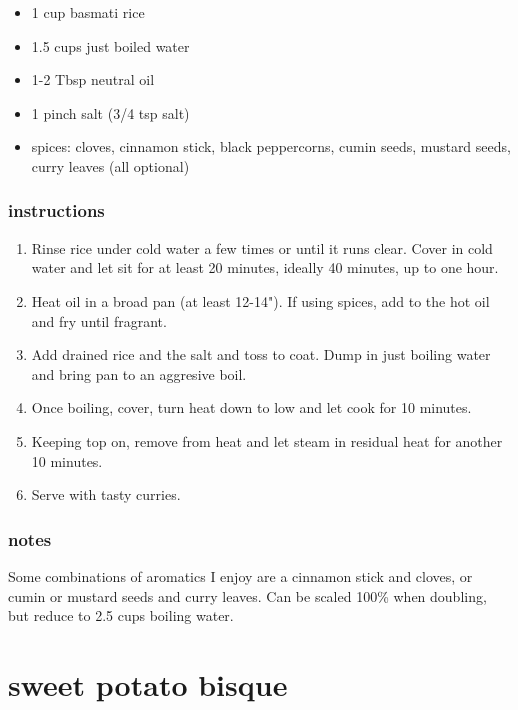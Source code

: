 \documentclass[]{book}
\providecommand{\tightlist}{%
  \setlength{\itemsep}{0pt}\setlength{\parskip}{0pt}}
\begin{document}
\begin{itemize}
\tightlist
\item
  1 cup basmati rice
\item
  1.5 cups just boiled water
\item
  1-2 Tbsp neutral oil
\item
  1 pinch salt (3/4 tsp salt)
\item
  spices: cloves, cinnamon stick, black peppercorns, cumin seeds, mustard seeds, curry leaves (all optional)
\end{itemize}

\hypertarget{instructions-17}{%
\subsection{instructions}\label{instructions-17}}

\begin{enumerate}
\def\labelenumi{\arabic{enumi}.}
\tightlist
\item
  Rinse rice under cold water a few times or until it runs clear. Cover in cold water and let sit for at
  least 20 minutes, ideally 40 minutes, up to one hour.
\item
  Heat oil in a broad pan (at least 12-14"). If using spices, add to the hot oil and fry until fragrant.
\item
  Add drained rice and the salt and toss to coat. Dump in just boiling water and bring pan to an aggresive boil.
\item
  Once boiling, cover, turn heat down to low and let cook for 10 minutes.
\item
  Keeping top on, remove from heat and let steam in residual heat for another 10 minutes.
\item
  Serve with tasty curries.
\end{enumerate}

\hypertarget{notes-17}{%
\subsection{notes}\label{notes-17}}

Some combinations of aromatics I enjoy are a cinnamon stick and cloves, or cumin or mustard seeds and curry leaves.
Can be scaled 100\% when doubling, but reduce to 2.5 cups boiling water.

\hypertarget{sweet-potato-bisque}{%
\chapter{sweet potato bisque}\label{sweet-potato-bisque}}
\end{document}
